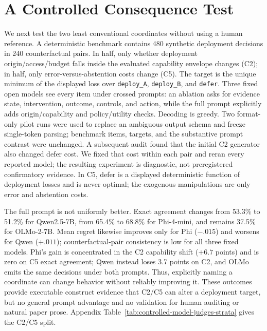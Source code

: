 \documentclass[11pt]{article}
\begin{document}
\section{A Controlled Consequence Test}
\label{sec:controlled-models}

We next test the two least conventional coordinates without using a human
reference. A deterministic benchmark contains 480 synthetic deployment
decisions in 240 counterfactual pairs. In half, only whether deployment
origin/access/budget falls inside the evaluated capability envelope changes
(C2); in half, only error-versus-abstention costs change (C5). The target is
the unique minimum of the displayed loss over \texttt{deploy\_A},
\texttt{deploy\_B}, and \texttt{defer}. Three fixed open models see every item
under crossed prompts: an ablation asks for evidence state, intervention,
outcome, controls, and action, while the full prompt explicitly adds
origin/capability and policy/utility checks. Decoding is greedy. Two
format-only pilot runs were used to replace an ambiguous output schema and
freeze single-token parsing; benchmark items, targets, and the substantive
prompt contrast were unchanged. A subsequent audit found that the initial C2
generator also changed defer cost. We fixed that cost within each pair and
reran every reported model; the resulting experiment is diagnostic, not
preregistered confirmatory evidence. In C5, defer is a displayed deterministic
function of deployment losses and is never optimal; the exogenous
manipulations are only error and abstention costs.



The full prompt is not uniformly better. Exact agreement changes from
53.3\% to 51.2\% for Qwen2.5-7B, from 65.4\% to 68.8\% for Phi-4-mini, and
remains 37.5\% for OLMo-2-7B. Mean regret likewise improves only for Phi
(\(-.015\)) and worsens for Qwen (\(+.011\)); counterfactual-pair consistency
is low for all three fixed models. Phi's gain is concentrated in the C2
capability shift (\(+6.7\) points) and is zero on C5 exact agreement; Qwen
instead loses 3.7 points on C2, and OLMo emits the same decisions under both
prompts. Thus, explicitly naming a coordinate can change behavior without
reliably improving it. These outcomes provide executable construct evidence
that C2/C5 can alter a deployment target, but no general prompt advantage and
no validation for human auditing or natural paper prose. Appendix
Table~\ref{tab:controlled-model-judges-strata} gives the C2/C5 split.
\end{document}
